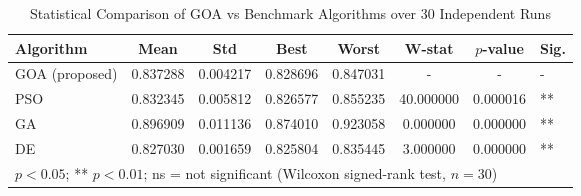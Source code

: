 \begin{table}[htbp]
\centering
\caption{Statistical Comparison of GOA vs Benchmark Algorithms over 30 Independent Runs}
\label{tab:statistical_comparison}
\begin{tabular}{lccccccl}
\hline
\textbf{Algorithm} & \textbf{Mean} & \textbf{Std} & \textbf{Best} & \textbf{Worst} & \textbf{W-stat} & \textbf{$p$-value} & \textbf{Sig.} \\
\hline
GOA (proposed) & 0.837288 & 0.004217 & 0.828696 & 0.847031 & - & - & - \\
PSO & 0.832345 & 0.005812 & 0.826577 & 0.855235 & 40.000000 & 0.000016 & ** \\
GA & 0.896909 & 0.011136 & 0.874010 & 0.923058 & 0.000000 & 0.000000 & ** \\
DE & 0.827030 & 0.001659 & 0.825804 & 0.835445 & 3.000000 & 0.000000 & ** \\
\hline
\multicolumn{8}{l}{\footnotesize * $p < 0.05$; ** $p < 0.01$; ns = not significant (Wilcoxon signed-rank test, $n=30$)} \\
\end{tabular}
\end{table}